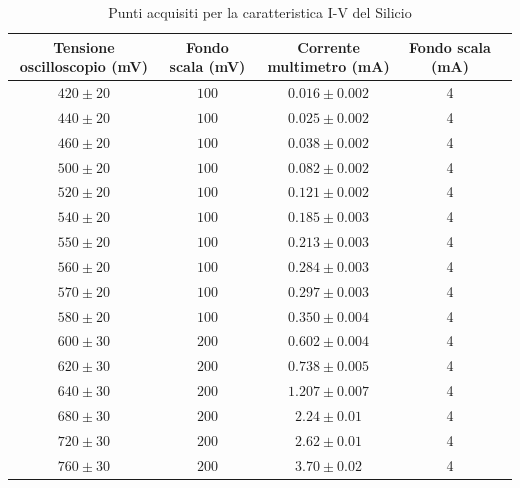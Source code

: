 \documentclass[]{article}
\begin{document}
	\begin{table}[H]
		\centering
	\begin{tabular}{|c|c|c|c|c|}
		\hline
		Tensione oscilloscopio (mV)& Fondo scala (mV) & Corrente multimetro (mA) &Fondo scala (mA)\\
		\hline
		$ 420\pm 20 $ &$ 100 $ & $ 0.016\pm 0.002 $ &4\\
		\hline
		$440\pm20 $ &$ 100 $ & $ 0.025\pm0.002 $ &4 \\
		\hline
		$ 460\pm 20 $ &$ 100 $ & $ 0.038\pm 0.002 $ &4 \\
		\hline
		$ 500\pm 20 $ &$ 100 $ & $ 0.082\pm 0.002 $ &4 \\
		\hline
		$ 520\pm 20 $ &$ 100 $ & $0.121\pm 0.002$ &4 \\
		\hline
		$ 540\pm 20 $ &$ 100 $ & $ 0.185\pm 0.003 $ &4 \\
		\hline
		$ 550\pm 20 $ &$ 100 $ & $ 0.213\pm 0.003 $ &4 \\
		\hline
		$ 560\pm 20 $ &$ 100 $ & $ 0.284\pm 0.003 $ &4 \\
		\hline
		$ 570\pm 20 $ &$ 100 $ & $ 0.297\pm 0.003 $ &4 \\
		\hline
		$ 580\pm 20 $ &$ 100 $ & $ 0.350\pm 0.004 $ &4 \\
		\hline
		$ 600\pm 30 $ &$ 200 $ & $ 0.602\pm0.004 $  &4\\
		\hline
		$ 620\pm 30 $ &$ 200 $ & $ 0.738\pm0.005 $  &4\\
		\hline
		$ 640\pm 30 $ &$ 200 $ & $ 1.207\pm0.007 $  &4\\
		\hline
		$ 680\pm 30 $ &$ 200 $ & $ 2.24\pm 0.01 $ &4 \\
		\hline
		$ 720\pm 30 $ &$ 200 $ & $ 2.62\pm 0.01 $ &4 \\
		\hline
		$ 760\pm 30 $ &$ 200 $ & $ 3.70\pm 0.02 $ &4 \\
		\hline
			\end{tabular}
		\caption{Punti acquisiti per la caratteristica I-V del Silicio}
		\label{tab:silicio}
	\end{table}
\end{document}
